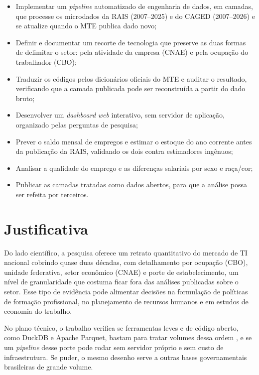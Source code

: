 \begin{itemize}
    \item Implementar um \textit{pipeline} automatizado de engenharia de dados, em camadas, que processe os microdados da RAIS (2007--2025) e do CAGED (2007--2026) e se atualize quando o MTE publica dado novo;
    \item Definir e documentar um recorte de tecnologia que preserve as duas formas de delimitar o setor: pela atividade da empresa (CNAE) e pela ocupação do trabalhador (CBO);
    \item Traduzir os códigos pelos dicionários oficiais do MTE e auditar o resultado, verificando que a camada publicada pode ser reconstruída a partir do dado bruto;
    \item Desenvolver um \textit{dashboard} \textit{web} interativo, sem servidor de aplicação, organizado pelas perguntas de pesquisa;
    \item Prever o saldo mensal de empregos e estimar o estoque do ano corrente antes da publicação da RAIS, validando os dois contra estimadores ingênuos;
    \item Analisar a qualidade do emprego e as diferenças salariais por sexo e raça/cor;
    \item Publicar as camadas tratadas como dados abertos, para que a análise possa ser refeita por terceiros.
\end{itemize}

\section{Justificativa}

Do lado científico, a pesquisa oferece um retrato quantitativo do mercado de TI nacional cobrindo quase duas décadas, com detalhamento por ocupação (CBO), unidade federativa, setor econômico (CNAE) e porte de estabelecimento, um nível de granularidade que costuma ficar fora das análises publicadas sobre o setor. Esse tipo de evidência pode alimentar decisões na formulação de políticas de formação profissional, no planejamento de recursos humanos e em estudos de economia do trabalho.

No plano técnico, o trabalho verifica se ferramentas leves e de código aberto, como DuckDB e Apache Parquet, bastam para tratar volumes dessa ordem \cite{Raasveldt2019, ApacheParquet2024}, e se um \textit{pipeline} desse porte pode rodar sem servidor próprio e sem custo de infraestrutura. Se puder, o mesmo desenho serve a outras bases governamentais brasileiras de grande volume.

